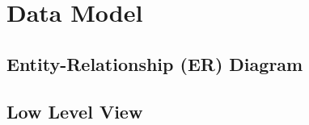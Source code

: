 \newpage
\section{Data Model}
\subsection{Entity-Relationship (ER) Diagram}




\subsection{Low Level View}



\newpage

\newpage



\subsection*{}
